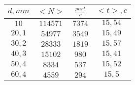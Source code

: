 \begin{tabular}{| c | c | c | c |}
\hline
$d, mm$ & $<N>$ & $\frac{part}{c}$ & $<t>, c$\\
\hline
$10$ & $114571$ & $7374$ & $15,54$\\
\hline
$20,1$ & $54977$ & $3549$ & $15,49$\\
\hline
$30,2$ & $28333$ & $1819$ & $15,57$\\
\hline
$40,3$ & $15102$ & $980$ & $15,41$\\
\hline
$50,4$ & $8334$ & $537$ & $15,52$\\
\hline
$60,4$ & $4559$ & $294$ & $15,5$\\
\hline
\end{tabular}
